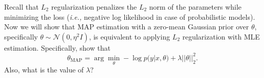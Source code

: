 \item  {} Recall that $L_2$ regularization penalizes the $L_2$ norm
of the parameters while minimizing the loss (\emph{i.e.,} negative log likelihood in case of
probabilistic models).
Now we will show that MAP estimation with a zero-mean
Gaussian prior over $\theta$, specifically $\theta \sim \mathcal{N}(0, \eta^2I)$,
is equivalent to applying $L_2$ regularization with MLE estimation. Specifically,
show that $$\theta_{\text{MAP}} = \arg\min_\theta - \log p(y|x,\theta) + \lambda||\theta||^2_2.$$
Also, what is the value of $\lambda$?


\ifnum{} {
  
} \fi
